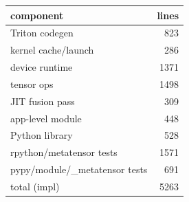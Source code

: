 \begin{tabular}{lr}
\toprule
component & lines \\
\midrule
Triton codegen & 823 \\
kernel cache/launch & 286 \\
device runtime & 1371 \\
tensor ops & 1498 \\
JIT fusion pass & 309 \\
app-level module & 448 \\
Python library & 528 \\
rpython/metatensor tests & 1571 \\
pypy/module/\_metatensor tests & 691 \\
total (impl) & 5263 \\
\bottomrule
\end{tabular}
